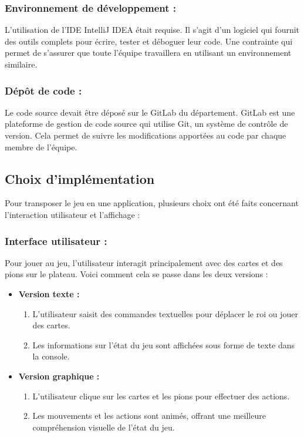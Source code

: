 \subsubsection*{Environnement de développement :} 
L'utilisation de l'IDE IntelliJ IDEA était requise. Il s’agit d’un logiciel qui fournit des outils complets pour écrire, tester et déboguer leur code. Une contrainte qui permet de s’assurer que toute l’équipe travaillera en utilisant un environnement similaire.
\subsubsection*{Dépôt de code :} 
Le code source devait être déposé sur le GitLab du département. GitLab est une plateforme de gestion de code source qui utilise Git, un système de contrôle de version. Cela permet de suivre les modifications apportées au code par chaque membre de l'équipe.

\subsection{Choix d'implémentation}

Pour transposer le jeu en une application, plusieurs choix ont été faits concernant l'interaction utilisateur et l'affichage :

\subsubsection*{Interface utilisateur :}
Pour jouer au jeu, l'utilisateur interagit principalement avec des cartes et des pions sur le plateau. Voici comment cela se passe dans les deux versions :
\begin{itemize}
	\item \textbf{Version texte :}
		\begin{enumerate}
			\item L'utilisateur saisit des commandes textuelles pour déplacer le roi ou jouer des cartes.
			\item Les informations sur l'état du jeu sont affichées sous forme de texte dans la console.
		\end{enumerate}
	\item \textbf{Version graphique :}
		\begin{enumerate}
			\item L'utilisateur clique sur les cartes et les pions pour effectuer des actions.
			\item Les mouvements et les actions sont animés, offrant une meilleure compréhension visuelle de l'état du jeu.
		\end{enumerate}
\end{itemize}

